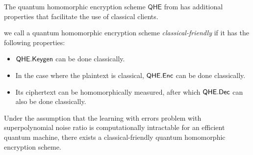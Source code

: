 The quantum homomorphic encryption scheme $\mathsf{QHE}$ from \cite{mahadev_qfhe} has additional properties that facilitate the use of classical clients.

\begin{definition}
	we call a quantum homomorphic encryption scheme \emph{classical-friendly} if it has the following properties:
	\begin{itemize}
		\item $\mathsf{QHE.Keygen}$ can be done classically.
		\item In the case where the plaintext is classical, $\mathsf{QHE.Enc}$ can be done classically.
		\item Its ciphertext can be homomorphically measured, after which $\mathsf{QHE.Dec}$ can also be done classically.
	\end{itemize}
\end{definition}

\begin{theorem} 
	Under the assumption that the learning with errors problem with superpolynomial noise ratio is computationally intractable for an efficient quantum machine,
	there exists a classical-friendly quantum homomorphic encryption scheme.
\end{theorem}
